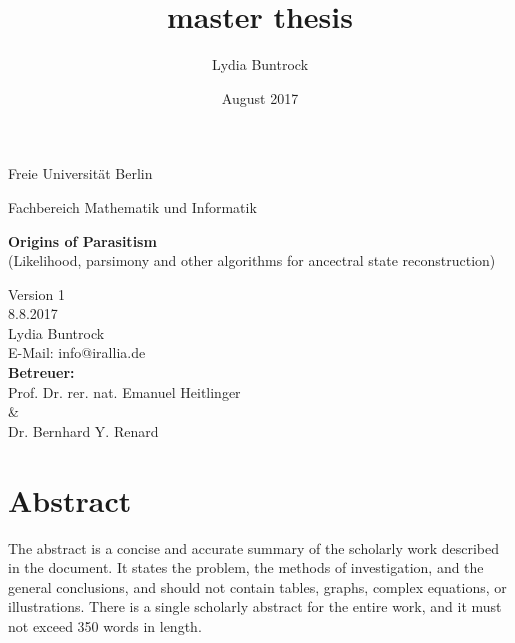 
\author{Lydia Buntrock}
\title{master thesis}
\date{August 2017}


  \begin{titlepage}
    \pagestyle{empty}
  	\begin{center}
      {\Large Freie Universität Berlin}\\
    	\begin{Huge}
      	Fachbereich Mathematik und Informatik\\
      	\vspace{3mm}
    	\end{Huge}
    	\vspace{20mm}
    	\begin{Large}
    	    \textbf{Origins of Parasitism}\\
          (Likelihood, parsimony and other algorithms for ancectral state reconstruction)\\
    	\end{Large}
    	\vspace{8mm}
      Version 1\\
      8.8.2017\\
    	\vspace{2cm}
    	Lydia Buntrock \\
      E-Mail: info@irallia.de\\
     	\vspace{5cm}
    	\textbf{Betreuer:}\\
      Prof. Dr. rer. nat. Emanuel Heitlinger\\
      \& \\
      Dr. Bernhard Y. Renard\\
  	\end{center}
  	\clearpage
  \end{titlepage}

\chapter*{Abstract}
  The abstract is a concise and accurate summary of the scholarly work described in the document. It 
  states the problem, the methods of investigation, and the general conclusions, and should not 
  contain tables, graphs, complex equations, or illustrations. There is a single scholarly abstract 
  for the entire work, and it must not exceed 350 words in length.

